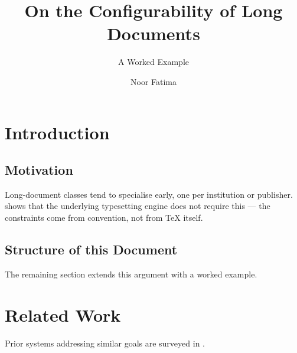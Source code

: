 \documentclass{thesis}
\title{On the Configurability of Long Documents}
\subtitle{A Worked Example}
\author{Noor Fatima}
\begin{document}
\toc

\section{Introduction}
\subsection{Motivation}
Long-document classes tend to specialise early, one per institution or
publisher. \cite{knuth1984texbook} shows that the underlying typesetting
engine does not require this — the constraints come from convention, not
from \TeX{} itself.

\subsection{Structure of this Document}
The remaining section extends this argument with a worked example.

\section{Related Work}
Prior systems addressing similar goals are surveyed in
\cite{knuth1984texbook}.

\end{document}
